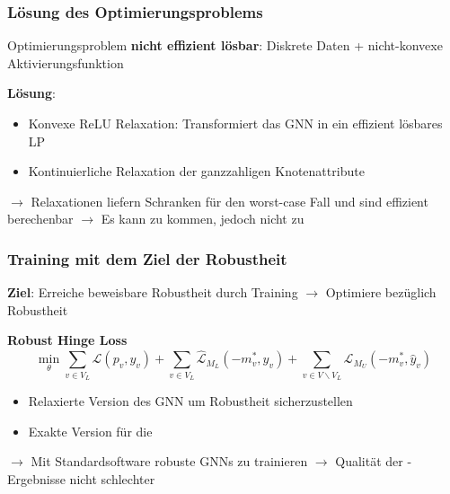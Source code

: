 \documentclass{beamer}
\begin{document}
\begin{frame}
  \frametitle{Lösung des Optimierungsproblems}
  Optimierungsproblem \textbf{nicht effizient lösbar}:\newline 
  Diskrete Daten + nicht-konvexe Aktivierungsfunktion\newline

  \textbf{Lösung}:
  \begin{itemize}
    \item Konvexe ReLU Relaxation: Transformiert das GNN in ein effizient lösbares LP
    \item Kontinuierliche Relaxation der ganzzahligen Knotenattribute
  \end{itemize}

  $\rightarrow$ Relaxationen liefern Schranken für den worst-case Fall und sind effizient berechenbar\newline
  $\rightarrow$ Es kann zu  kommen, jedoch nicht zu 
\end{frame}

\begin{frame}
  \frametitle{Training mit dem Ziel der Robustheit}

  \textbf{Ziel}: Erreiche beweisbare Robustheit durch Training\newline
  $\rightarrow$ Optimiere bezüglich Robustheit

  \textbf{Robust Hinge Loss}
  \[
  \min_{\theta} \sum_{v \in V_L} \mathcal{L}(p_v, y_v) + \sum_{v \in V_L} \mathcal{\hat{L}}_{M_L} (-m^{\ast}_v, y_v)
  + \sum_{v \in V \backslash V_L} \mathcal{\hat{L}}_{M_U} (-m^{\ast}_v, \hat{y}_v)
  \]

  \begin{itemize}
    \item Relaxierte Version des GNN um Robustheit sicherzustellen
    \item Exakte Version für die 
  \end{itemize}  

  $\rightarrow$ Mit Standardsoftware robuste GNNs zu trainieren\newline
  $\rightarrow$ Qualität der -Ergebnisse nicht schlechter
\end{frame}
\end{document}
